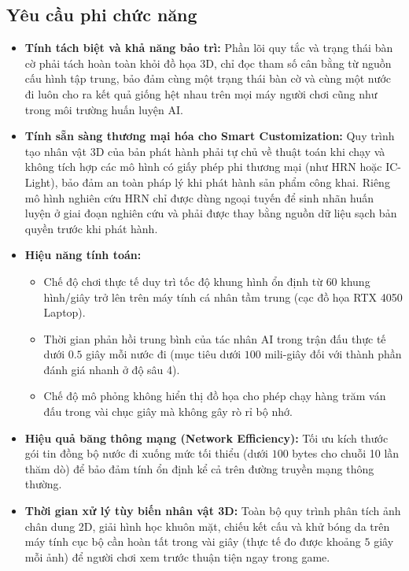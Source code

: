 \subsection{Yêu cầu phi chức năng}
\begin{itemize}
    \item \textbf{Tính tách biệt và khả năng bảo trì:} Phần lõi quy tắc và trạng thái bàn cờ phải tách hoàn toàn khỏi đồ họa 3D, chỉ đọc tham số cân bằng từ nguồn cấu hình tập trung, bảo đảm cùng một trạng thái bàn cờ và cùng một nước đi luôn cho ra kết quả giống hệt nhau trên mọi máy người chơi cũng như trong môi trường huấn luyện AI.
    \item \textbf{Tính sẵn sàng thương mại hóa cho Smart Customization:} Quy trình tạo nhân vật 3D của bản phát hành phải tự chủ về thuật toán khi chạy và không tích hợp các mô hình có giấy phép phi thương mại (như HRN hoặc IC-Light), bảo đảm an toàn pháp lý khi phát hành sản phẩm công khai. Riêng mô hình nghiên cứu HRN chỉ được dùng ngoại tuyến để sinh nhãn huấn luyện ở giai đoạn nghiên cứu và phải được thay bằng nguồn dữ liệu sạch bản quyền trước khi phát hành.
    \item \textbf{Hiệu năng tính toán:}
    \begin{itemize}
        \item Chế độ chơi thực tế duy trì tốc độ khung hình ổn định từ $60$ khung hình/giây trở lên trên máy tính cá nhân tầm trung (cạc đồ họa RTX 4050 Laptop).
        \item Thời gian phản hồi trung bình của tác nhân AI trong trận đấu thực tế dưới $0.5$ giây mỗi nước đi (mục tiêu dưới $100$ mili-giây đối với thành phần đánh giá nhanh ở độ sâu 4).
        \item Chế độ mô phỏng không hiển thị đồ họa cho phép chạy hàng trăm ván đấu trong vài chục giây mà không gây rò rỉ bộ nhớ.
    \end{itemize}
    \item \textbf{Hiệu quả băng thông mạng (Network Efficiency):} Tối ưu kích thước gói tin đồng bộ nước đi xuống mức tối thiểu (dưới $100$ bytes cho chuỗi 10 lần thăm dò) để bảo đảm tính ổn định kể cả trên đường truyền mạng thông thường.
    \item \textbf{Thời gian xử lý tùy biến nhân vật 3D:} Toàn bộ quy trình phân tích ảnh chân dung 2D, giải hình học khuôn mặt, chiếu kết cấu và khử bóng da trên máy tính cục bộ cần hoàn tất trong vài giây (thực tế đo được khoảng $5$ giây mỗi ảnh) để người chơi xem trước thuận tiện ngay trong game.
\end{itemize}

